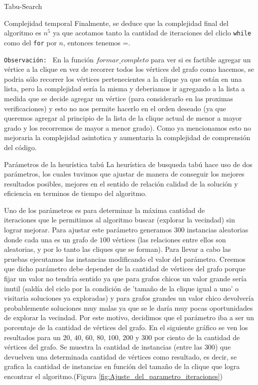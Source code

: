 \begin{section}{Tabu-Search}
\begin{subsection}{Complejidad temporal}
			 Finalmente, se deduce que la complejidad final del algoritmo es $n^5$ ya que acotamos tanto la cantidad de iteraciones del cliclo \texttt{while} como del \texttt{for} por $n$, entonces tenemos =.\Pa
			 
			 \texttt{Observación: } En la función $formar\_completo$ para ver si es factible agregar un vértice a la clique en vez de recorrer todos los vértices del grafo como hacemos, se podria sólo recorrer los vértices pertenecientes a la clique ya que están en una lista, pero la complejidad sería la misma y deberiamos ir agregando a la lista a medida que se decide agregar un vértice (para considerarlo en las proximas verificaciones) y esto no nos permite hacerlo en el orden deseado (ya que queremos agregar al principio de la lista de la clique actual de menor a mayor grado y los recorremos de mayor a menor grado). Como ya mencionamos esto no mejoraria la complejidad asintotica y aumentaria la complejidad de comprensión del código.
	\end{subsection}

	\begin{subsection}{Parámetros de la heurística tabú}
		La heurística de busqueda tabú hace uso de dos parámetros, los cuales tuvimos que ajustar de manera de conseguir los mejores resultados posibles, mejores en el sentido de relación calidad de la solución y eficiencia en terminos de tiempo del algoritmo.

		Uno de los parámetros es para determinar la máxima cantidad de\\ iteraciones que le permitimos al algoritmo buscar (explorar la vecindad) sin lograr mejorar. Para ajustar este parámetro generamos $300$ instancias aleatorias donde cada una es un grafo de $100$ vértices (las relaciones entre ellos son aleatorias, y por lo tanto las cliques que se forman). Para llevar a cabo las pruebas ejecutamos las instancias modificando el valor del parámetro. Creemos que dicho parámetro debe depender de la cantidad de vértices del grafo porque fijar un valor no tendría sentido ya que para grafos chicos un valor grande sería inutil (saldía del ciclo por la condición de 'tamaño de la clique igual a uno' o visitaria soluciones ya exploradas) y para grafos grandes un valor chico devolvería probablemente soluciones muy malas ya que se le daría muy pocas oportunidades de explorar la vecindad. Por este motivo, decidimos que el parámetro iba a ser un porcentaje de la cantidad de vértices del grafo. En el siguiente gráfico se ven los resultados para un $20$, $40$, $60$, $80$, $100$, $200$ y $300$ por ciento de la cantidad de vértices del grafo. Se muestra la cantidad de instancias (entre las $300$) que devuelven una determinada cantidad de vértices como resultado, es decir, se grafica la cantidad de instancias en función del tamaño de la clique que logra encontrar el algoritmo.(Figura \ref{fig:Ajuste_del_parametro_iteraciones})


\end{subsection}
\end{section}
